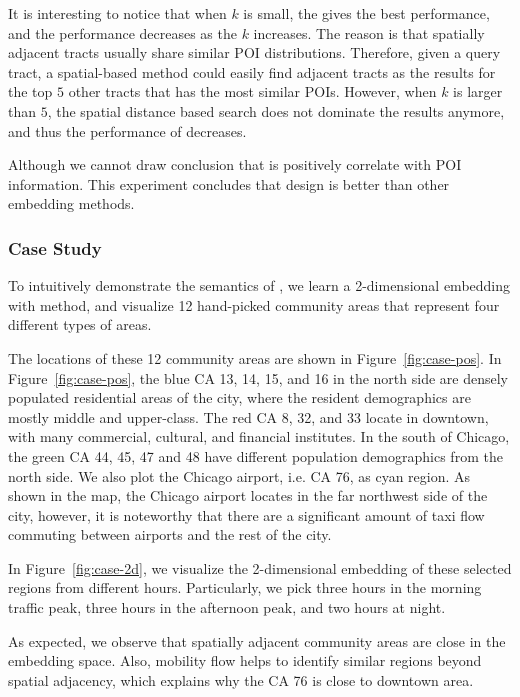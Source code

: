 It is interesting to notice that when $k$ is small, the \dges gives the best performance, and the performance decreases as the $k$ increases. The reason is that spatially adjacent tracts usually share similar POI distributions. Therefore, given a query tract, a spatial-based method could easily find adjacent tracts as the results for the top $5$ other tracts that has the most similar POIs. However, when $k$ is larger than $5$, the spatial distance based search does not dominate the results anymore, and thus the performance of \dges decreases.


Although we cannot draw conclusion that \hdge is positively correlate with POI information. This experiment concludes that \hdge design is better than other embedding methods.








\subsubsection{Case Study}


To intuitively demonstrate the semantics of \hdge, we learn a 2-dimensional embedding with \hdge method, and visualize 12 hand-picked community areas that represent four different types of areas.

The locations of these 12 community areas are shown in Figure~\ref{fig:case-pos}. In Figure~\ref{fig:case-pos}, the blue CA 13, 14, 15, and 16 in the north side are densely populated residential areas of the city, where the resident demographics are mostly middle and upper-class. The red CA 8, 32, and 33 locate in downtown, with many commercial, cultural, and financial institutes. In the south of Chicago, the green CA 44, 45, 47 and 48 have different population demographics from the north side. We also plot the Chicago airport, i.e. CA 76, as cyan region. As shown in the map, the Chicago airport locates in the far northwest side of the city, however, it is noteworthy that there are a significant amount of taxi flow commuting between airports and the rest of the city.


In Figure~\ref{fig:case-2d}, we visualize the 2-dimensional embedding of these selected regions from different hours. Particularly, we pick three hours in the morning traffic peak, three hours in the afternoon peak, and two hours at night. 

As expected, we observe that spatially adjacent community areas are close in the \hdge embedding space. Also, mobility flow helps to identify similar regions beyond spatial adjacency, which explains why the CA 76 is close to downtown area.



